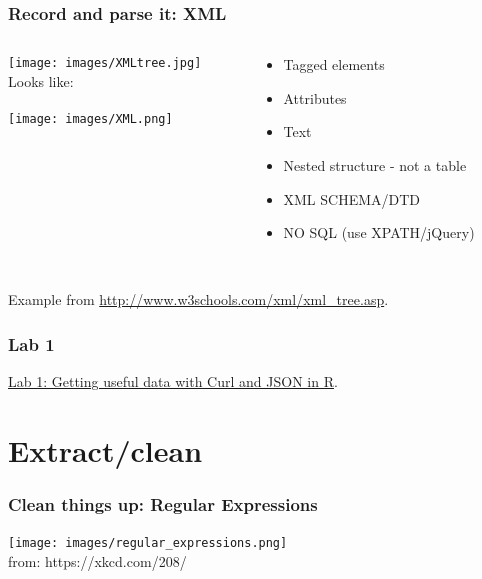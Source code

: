 \documentclass[]{beamer}
\begin{document}
\begin{frame}
\frametitle{Record and parse it: XML}   %
\begin{columns}[onlytextwidth]
\begin{column}{.5\textwidth}
\centering
\texttt{[image: images/XMLtree.jpg]}\\ \tiny Looks like:\\~\\
\texttt{[image: images/XML.png]}
\end{column}
\begin{column}{.4\textwidth}
\begin{itemize}
  \item Tagged elements
  \item Attributes
  \item Text
  \item Nested structure - not a table\\
  \item XML SCHEMA/DTD\\
  \item NO SQL (use XPATH/jQuery)\\
\end{itemize}
\end{column}
\end{columns}
~\\\tiny Example from \url{http://www.w3schools.com/xml/xml_tree.asp}.
\end{frame}


\begin{frame}
  \frametitle{Lab 1}   %
	\href{https://dl.dropbox.com/u/25710348/CSSscraping/scripts/CurlJSONXML.R}{\color{blue} Lab 1: Getting useful data with Curl and JSON in R}.
\end{frame}


\section{Extract/clean}
\setcounter{subsection}{1}
\begin{frame}
\frametitle{Clean things up: Regular Expressions}   %
\center
\texttt{[image: images/regular\_expressions.png]}
~\\ \small{from: https://xkcd.com/208/}
\end{frame}
\end{document}
